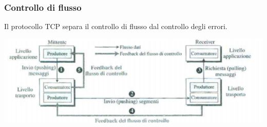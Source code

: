 \documentclass[12pt]{report}
\begin{document}
	\subsubsection{Controllo di flusso}
	Il protocollo TCP separa il controllo di flusso dal controllo degli errori.
	\begin{center}
		\includegraphics[scale=0.6]{assets/flowcontrol.png}
	\end{center}
\end{document}

